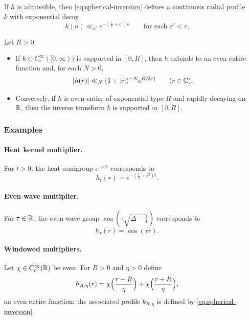 If $h$ is admissible, then \eqref{eq:spherical-inversion} defines a continuous radial profile $k$
with exponential decay
\[
k(u)\ll_{\varepsilon'} e^{-(\frac12+\varepsilon')u}
\qquad\text{for each }\varepsilon'<\varepsilon.
\]

\begin{theorem}\label{thm:paley-wiener}
Let $R>0$.
\begin{itemize}
\item[(PW$\Rightarrow$)] If $k\in C_c^\infty([0,\infty))$ is supported in $[0,R]$, then $h$ extends to an even entire function and,
for each $N>0$,
\[
|h(r)|\ll_{N}(1+|r|)^{-N}e^{R|\Im r|}
\qquad (r\in\mathbb{C}).
\]
\item[(PW$\Leftarrow$)] Conversely, if $h$ is even entire of exponential type $R$ and rapidly decaying on $\mathbb{R}$, then the inverse transform $k$
is supported in $[0,R]$.
\end{itemize}
\end{theorem}

\subsubsection{Examples}\label{subsec:selberg-examples}

\paragraph{Heat kernel multiplier.}
For $t>0$, the heat semigroup $e^{-t\Delta}$ corresponds to
\[
h_t(r)=e^{-(\frac14+r^2)t}.
\]

\paragraph{Even wave multiplier.}
For $\tau\in\mathbb{R}$, the even wave group $\cos(\tau\sqrt{\Delta-\frac14})$ corresponds to
\[
h_\tau(r)=\cos(\tau r).
\]

\paragraph{Windowed multipliers.}
Let $\chi\in C_c^\infty(\mathbb{R})$ be even. For $R>0$ and $\eta>0$ define
\begin{equation}\label{eq:windowed-h}
h_{R,\eta}(r)
=
\chi\Bigl(\frac{r-R}{\eta}\Bigr)
+
\chi\Bigl(\frac{r+R}{\eta}\Bigr),
\end{equation}
an even entire function; the associated profile $k_{R,\eta}$ is defined by \eqref{eq:spherical-inversion}.

